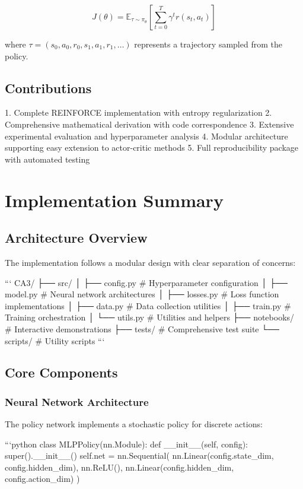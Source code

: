\documentclass{article}
\begin{document}
\[J(\theta) = \mathbb{E}_{\tau \sim \pi_\theta} \left[ \sum_{t=0}^T \gamma^t r(s_t, a_t) \right]\]

where $\tau = (s_0, a_0, r_0, s_1, a_1, r_1, \dots)$ represents a trajectory sampled from the policy.

\subsection{Contributions}

1. Complete REINFORCE implementation with entropy regularization
2. Comprehensive mathematical derivation with code correspondence
3. Extensive experimental evaluation and hyperparameter analysis
4. Modular architecture supporting easy extension to actor-critic methods
5. Full reproducibility package with automated testing

\section{Implementation Summary}

\subsection{Architecture Overview}

The implementation follows a modular design with clear separation of concerns:

```
CA3/
├── src/
│   ├── config.py      # Hyperparameter configuration
│   ├── model.py       # Neural network architectures
│   ├── losses.py      # Loss function implementations
│   ├── data.py        # Data collection utilities
│   ├── train.py       # Training orchestration
│   └── utils.py       # Utilities and helpers
├── notebooks/         # Interactive demonstrations
├── tests/            # Comprehensive test suite
└── scripts/          # Utility scripts
```

\subsection{Core Components}

\subsubsection{Neural Network Architecture}
The policy network implements a stochastic policy for discrete actions:

```python
class MLPPolicy(nn.Module):
    def __init__(self, config):
        super().__init__()
        self.net = nn.Sequential(
            nn.Linear(config.state_dim, config.hidden_dim),
            nn.ReLU(),
            nn.Linear(config.hidden_dim, config.action_dim)
        )
\end{document}
